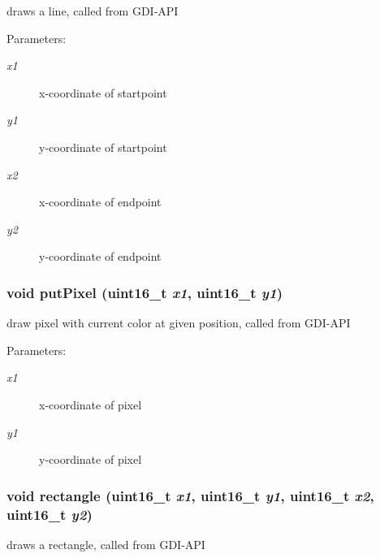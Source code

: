 draws a line, called from GDI-API 

\begin{Desc}
\item[Parameters:]
\begin{description}
\item[{\em x1}]x-coordinate of startpoint \item[{\em y1}]y-coordinate of startpoint \item[{\em x2}]x-coordinate of endpoint \item[{\em y2}]y-coordinate of endpoint \end{description}
\end{Desc}
\hypertarget{group__graphic__device_gb7831d44ca8d752c86a1953b2b898e5f}{
\subsubsection[{putPixel}]{\setlength{\rightskip}{0pt plus 5cm}void putPixel (uint16\_\-t {\em x1}, \/  uint16\_\-t {\em y1})}}
\label{group__graphic__device_gb7831d44ca8d752c86a1953b2b898e5f}


draw pixel with current color at given position, called from GDI-API 

\begin{Desc}
\item[Parameters:]
\begin{description}
\item[{\em x1}]x-coordinate of pixel \item[{\em y1}]y-coordinate of pixel \end{description}
\end{Desc}
\hypertarget{group__graphic__device_g6d8d01808fb00f5848e16621995a6657}{
\subsubsection[{rectangle}]{\setlength{\rightskip}{0pt plus 5cm}void rectangle (uint16\_\-t {\em x1}, \/  uint16\_\-t {\em y1}, \/  uint16\_\-t {\em x2}, \/  uint16\_\-t {\em y2})}}
\label{group__graphic__device_g6d8d01808fb00f5848e16621995a6657}


draws a rectangle, called from GDI-API 


